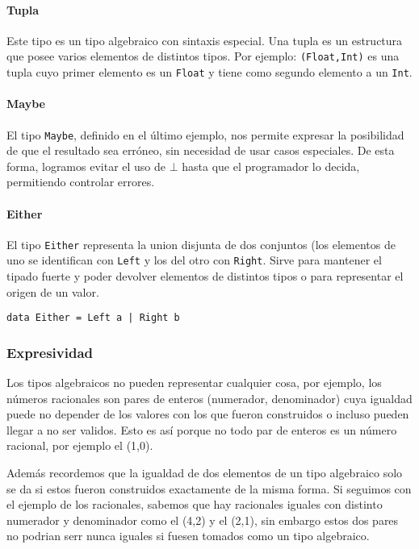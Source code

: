 \documentclass[10pt,a4paper]{article}
\begin{document}
\paragraph{Tupla} Este tipo es un tipo algebraico con sintaxis especial. Una tupla es un estructura que posee varios elementos de distintos tipos. Por ejemplo: \texttt{(Float,Int)} es una tupla cuyo primer elemento es un \texttt{Float} y tiene como segundo elemento a un \texttt{Int}.

\paragraph{Maybe} El tipo \texttt{Maybe}, definido en el último ejemplo, nos permite expresar la posibilidad de que el resultado sea erróneo, sin necesidad de usar casos especiales. De esta forma, logramos evitar el uso de $\bot$ hasta que el programador lo decida, permitiendo controlar errores.

\paragraph{Either} El tipo \texttt{Either} representa la union disjunta de dos conjuntos (los elementos de uno se identifican con \texttt{Left} y los del otro con \texttt{Right}. Sirve para mantener el tipado fuerte y poder devolver elementos de distintos tipos o para representar el origen de un valor.
\begin{centrado}
	\begin{verbatim}
data Either = Left a | Right b
	\end{verbatim}
\end{centrado}

\subsubsection{Expresividad}
Los tipos algebraicos no pueden representar cualquier cosa, por ejemplo, los números racionales son pares de enteros (numerador, denominador) cuya igualdad puede no depender de los valores con los que fueron construidos o incluso pueden llegar a no ser validos. Esto es así porque no todo par de enteros es un número racional, por ejemplo el (1,0). 

Además recordemos que la igualdad de dos elementos de un tipo algebraico solo se da si estos fueron construidos exactamente de la misma forma. Si seguimos con el ejemplo de los racionales, sabemos que hay racionales iguales con distinto numerador y denominador como el (4,2) y el (2,1), sin embargo estos dos pares no podrian serr nunca iguales si fuesen tomados como un tipo algebraico.
\end{document}
